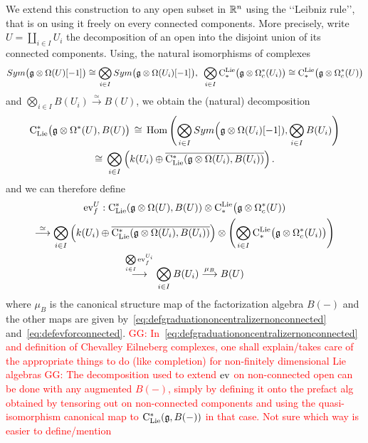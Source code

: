 \documentclass[11pt]{amsart}
\numberwithin{equation}{section}
\def\greg{\textcolor{red}{GG: }\textcolor{red}}
\begin{document}
We extend this construction  to any 
 open subset in $\mathbb R^n$ using the \lq\lq{}Leibniz rule\rq\rq{}, that is on using it freely on every connected components. 
 More precisely, 
  write $U=\coprod_{i\in I} U_i$ the decomposition of an open into the  disjoint union 
of its connected components. Using, the natural isomorphisms of complexes 
\[Sym\big(\mathfrak g \otimes \Omega (U)[-1]\big) 
\cong \bigotimes\limits_{i\in I} Sym\big(\mathfrak g \otimes \Omega ( U_i)[-1]\big), \mbox{  } 
\bigotimes_{i\in I} {\rm C}^{\rm Lie}_*\big(\mathfrak g \otimes \Omega_c^* (U_i)\big) \cong
{\rm C}^{\rm Lie}_*\big(\mathfrak g \otimes \Omega_c^* (U)\big)\] and
$\bigotimes_{i\in I} B(U_i) 
\stackrel{\simeq}\longrightarrow B(U)$, we obtain the 
 (natural) decomposition 
\begin{multline}\label{eq:defgraduationoncentralizernonconnected}
 {\rm C}_{\rm Lie}^*\big(\mathfrak g\otimes \Omega^*(U), B(U)\big)  \, \cong \, 
 {\rm Hom}\left(\bigotimes\limits_{i\in I} Sym\Big(\mathfrak g\otimes \Omega (U_i)[-1]), 
 \bigotimes\limits_{i\in I} B(U_i)\right) \\ \cong \, 
 \bigotimes\limits_{i\in I}\left( k(U_i) \oplus \overline{{\rm C}_{\rm Lie}^* (\mathfrak g\otimes \Omega (U_i), B(U_i))  }\right).
\end{multline}
and we can therefore define 
\begin{multline}\label{eq:defineevf}
 {\rm ev}_f^U: {\rm C}_{\rm Lie}^* (\mathfrak g\otimes \Omega (U), B(U)) \otimes {\rm C}^{\rm Lie}_*\big(\mathfrak g \otimes \Omega_c^* (U)) 
 \\ \stackrel{\simeq}\longrightarrow  
\bigotimes\limits_{i\in I}\left( k(U_i) \oplus \overline{{\rm C}_{\rm Lie}^* (\mathfrak g\otimes \Omega (U_i), B(U_i))  }\right) \otimes 
 \left(\bigotimes\limits_{i\in I}{\rm C}^{\rm Lie}_*\big(\mathfrak g \otimes \Omega_c^* (U_i)\big)\right)  \\ 
 \stackrel{\bigotimes\limits_{i\in I}{\rm ev}^{U_i}_f}\longrightarrow  
 \bigotimes\limits_{i\in I} B(U_i) \stackrel{\mu_B}\longrightarrow B(U)
\end{multline}
where $\mu_B$ is the canonical structure map of the factorization algebra $B(-)$ and the other maps are given by~\eqref{eq:defgraduationoncentralizernonconnected} 
and~\eqref{eq:defevforconnected}.
\greg{In~\eqref{eq:defgraduationoncentralizernonconnected} and definition of Chevalley Eilneberg complexes, one shall explain/takes care of the appropriate 
things to do (like completion) for non-finitely dimensional Lie algebras}
\greg{The decomposition used to extend ${\rm ev}$ on non-connected open can be done with any augmented $B(-)$, simply by defining it onto the prefact alg obtained by tensoring 
out on non-connected components and using the quasi-isomorphism canonical map to ${\rm C}_{\rm Lie}^*(\mathfrak g, B(-))$ in that case. Not sure which way is easier to define/mention}
\end{document}
